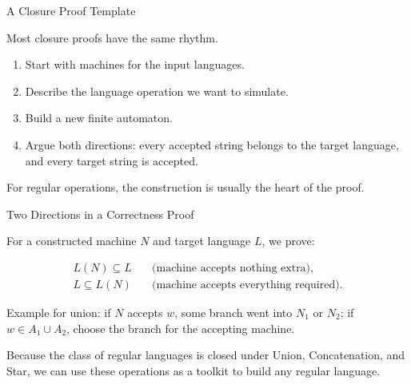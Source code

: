 \documentclass[10pt,aspectratio=169]{beamer}
\begin{document}
\begin{frame}{A Closure Proof Template}

Most closure proofs have the same rhythm.

\vspace{0.8em}
\begin{enumerate}
    \item Start with machines for the input languages.
    \item Describe the language operation we want to simulate.
    \item Build a new finite automaton.
    \item Argue both directions: every accepted string belongs to the target language, and every target string is accepted.
\end{enumerate}

\vspace{0.8em}
For regular operations, the construction is usually the heart of the proof.

\end{frame}

\begin{frame}{Two Directions in a Correctness Proof}

For a constructed machine $N$ and target language $L$, we prove:

\vspace{0.8em}
\begin{align*}
L(N) \subseteq L &\quad \text{(machine accepts nothing extra)},\\
L \subseteq L(N) &\quad \text{(machine accepts everything required)}.
\end{align*}

\vspace{0.8em}
Example for union: if $N$ accepts $w$, some branch went into $N_1$ or $N_2$; if $w\in A_1\cup A_2$, choose the branch for the accepting machine.

\end{frame}

\begin{frame}[standout]
Because the class of regular languages is closed under Union, Concatenation, and Star, we can use these operations as a toolkit to build any regular language.
\end{frame}

\end{document}
